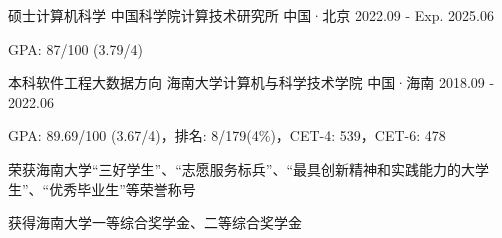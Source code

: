 

\begin{cventries}

\cventry
{硕士{\enskip\cdotp\enskip}计算机科学} %
{中国科学院{\enskip\cdotp\enskip}计算技术研究所} %
{中国·北京} %
{2022.09 - Exp. 2025.06} %
{
    \begin{cvitems} %
        \item {GPA: 87/100 (3.79/4)}
    \end{cvitems}
}

\cventry
{本科{\enskip\cdotp\enskip}软件工程大数据方向} %
{海南大学{\enskip\cdotp\enskip}计算机与科学技术学院} %
{中国·海南} %
{2018.09 - 2022.06} %
{
    \begin{cvitems} %
        \item {GPA: 89.69/100 (3.67/4)，排名: 8/179(4\%)，CET-4: 539，CET-6: 478}
        \item {荣获海南大学“三好学生”、“志愿服务标兵”、“最具创新精神和实践能力的大学生”、“优秀毕业生”等荣誉称号}
        \item {获得海南大学一等综合奖学金、二等综合奖学金}
    \end{cvitems}
}

\end{cventries}
